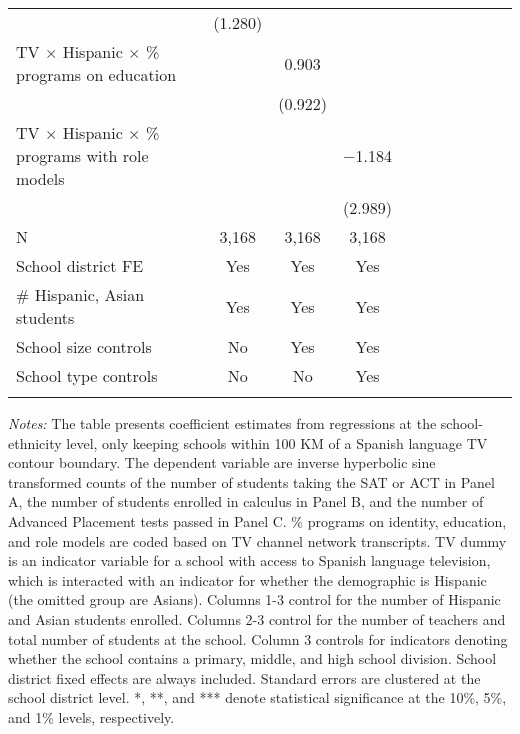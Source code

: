 \begin{table}[!htbp]
{\begin{threeparttable}
\begin{tabular}{lcccccccccc}
				  & (1.280) &  &  \\
				 TV $\times$ Hispanic $\times$ \% programs on education &  & 0.903 &  \\ 
				  &  & (0.922) &  \\ 
				 TV $\times$ Hispanic $\times$ \% programs with role models &  &  & $-$1.184 \\ 
				  &  &  & (2.989) \\ 
				  \addlinespace\hline
				N & 3,168 & 3,168 & 3,168 \\ 
				\hline\hline\addlinespace
				School district FE & Yes & Yes  & Yes\\
				\# Hispanic, Asian students & Yes & Yes  & Yes\\
                                	School size controls & No & Yes & Yes\\
                                	School type controls & No & No & Yes \\
					\addlinespace\hline\hline
			\end{tabular}
			\begin{tablenotes}[flushleft]
				\item \textit{Notes:} The table presents coefficient estimates from regressions at the school-ethnicity level, only keeping schools within 100 KM of a Spanish language TV contour boundary. The dependent variable are inverse hyperbolic sine transformed counts of the number of students taking the SAT or ACT in Panel A, the number of students enrolled in calculus in Panel B, and the number of Advanced Placement tests passed in Panel C. \% programs on identity, education, and role models are coded based on TV channel network transcripts. TV dummy is an indicator variable for a school with access to Spanish language television, which is interacted with an indicator for whether the demographic is Hispanic (the omitted group are Asians). Columns 1-3 control for the number of Hispanic and Asian students enrolled. Columns 2-3 control for the number of teachers and total number of students at the school. Column 3 controls for indicators denoting whether the school contains a primary, middle, and high school division. School district fixed effects are always included. Standard errors are clustered at the school district level. *, **, and *** denote statistical significance at the 10\%, 5\%, and 1\% levels, respectively.			\end{tablenotes}
		\end{threeparttable}
	}
\end{table}